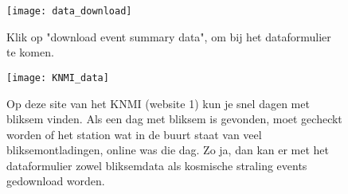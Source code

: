 \begin{figure}
    \centering
    \texttt{[image: data\_download]}
    \caption{Klik op "download event summary data", om bij het dataformulier te komen.}
    \label{fig:data_download}

\end{figure}

\begin{figure}
    \centering
    \texttt{[image: KNMI\_data]}
    \caption{Op deze site van het KNMI (website 1) kun je snel dagen met bliksem vinden. Als een dag 
    met bliksem is gevonden, moet gecheckt worden of het \hisparc station wat in de
    buurt staat van veel bliksemontladingen, online was die dag. Zo ja, dan kan 
    er met het dataformulier zowel bliksemdata als kosmische straling events
    gedownload worden.}
    \label{fig:KNMI_data}
\end{figure}



